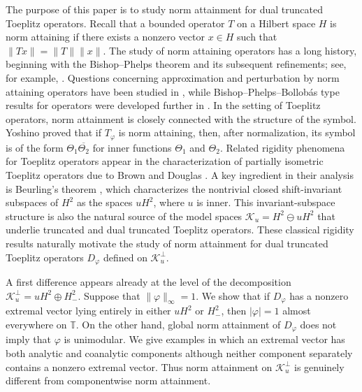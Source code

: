 \documentclass[12pt]{amsart}
\theoremstyle{definition}
\theoremstyle{remark}
\def \T{\mathbb{T}}
\newcommand{\clk}{\mathcal{K}}
\newcommand{\vp}{\varphi}
\numberwithin{equation}{section}
\begin{document}
The purpose of this paper is to study norm attainment for dual
truncated Toeplitz operators. Recall that a bounded operator $T$ on a
Hilbert space $H$ is norm attaining if there exists a nonzero vector $x\in H$ such that $\|Tx\|=\|T\|\|x\|$. The study of norm attaining operators has a long history, beginning with the Bishop--Phelps theorem and its subsequent refinements; see, for example,
\cite{Lindenstrauss1963,ACOSTA,AL,CASCALES}. Questions concerning approximation and perturbation by norm attaining
operators have been studied in \cite{Enflo,KOV1,KOV2,LEE}, while
Bishop--Phelps--Bollob\'as type results for operators were developed
further in \cite{CHOI}. In the setting of
Toeplitz operators, norm attainment is closely connected with the
structure of the symbol. Yoshino \cite{Yoshino2002} proved that if
$T_\vp$ is norm attaining, then, after normalization, its symbol is of the form $\Theta_1\overline{\Theta_2}$ for inner functions
$\Theta_1$ and $\Theta_2$. Related rigidity phenomena for Toeplitz operators appear in the characterization of partially isometric Toeplitz operators due to Brown and Douglas \cite{Brown:Douglas}. A key ingredient in their analysis is Beurling's theorem \cite{Beurling1948}, which characterizes the nontrivial closed shift-invariant subspaces of $H^2$ as the spaces $uH^2$, where $u$ is inner. This invariant-subspace structure is also
the natural source of the model spaces $\clk_u=H^2\ominus uH^2$ that underlie truncated and dual truncated Toeplitz operators.
These classical rigidity results naturally motivate the study of norm attainment for dual truncated Toeplitz operators $D_\vp$ defined on $\clk_u^\perp$.

A first difference appears already at the level of the decomposition
$\clk_u^\perp=uH^2\oplus H^2_{-}$. Suppose that
$\|\vp\|_\infty=1$. We show that if $D_\vp$ has a nonzero extremal
vector lying entirely in either $uH^2$ or $H^2_{-}$, then
$|\vp|=1$ almost everywhere on $\T$. On the other hand, global norm
attainment of $D_\vp$ does not imply that $\vp$ is unimodular. We
give examples in which an extremal vector has both analytic and
coanalytic components although neither component separately contains
a nonzero extremal vector. Thus norm attainment on
$\clk_u^\perp$ is genuinely different from componentwise norm
attainment.
\end{document}

